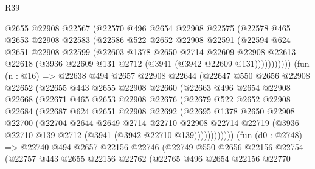 \begin{lexlean}{R39}
\begin{coremodule}
              @2655
              @22908
              @22567
              (@22570
                @496
                @2654
                @22908
                @22575
                (@22578
                  @465
                  @2653
                  @22908
                  @22583
                  (@22586
                    @522
                    @2652
                    @22908
                    @22591
                    (@22594
                      @624
                      @2651
                      @22908
                      @22599
                      (@22603
                        @1378
                        @2650
                        @2714
                        @22609
                        @22908
                        @22613
                        @22618
                        (@3936 @22609 @131 @2712 (@3941 (@3942 @22609 @131)))))))))))
        (fun (n : @16) =>
        @22638
          @494
          @2657
          @22908
          @22644
          (@22647
            @550
            @2656
            @22908
            @22652
            (@22655
              @443
              @2655
              @22908
              @22660
              (@22663
                @496
                @2654
                @22908
                @22668
                (@22671
                  @465
                  @2653
                  @22908
                  @22676
                  (@22679
                    @522
                    @2652
                    @22908
                    @22684
                    (@22687
                      @624
                      @2651
                      @22908
                      @22692
                      (@22695
                        @1378
                        @2650
                        @22908
                        @22700
                        (@22704
                          @2644
                          @2649
                          @2714
                          @22710
                          @22908
                          @22714
                          @22719
                          (@3936 @22710 @139 @2712 (@3941 (@3942 @22710 @139))))))))))))
        (fun (d0 : @2748) =>
        @22740
          @494
          @2657
          @22156
          @22746
          (@22749
            @550
            @2656
            @22156
            @22754
            (@22757
              @443
              @2655
              @22156
              @22762
              (@22765
                @496
                @2654
                @22156
                @22770

\end{coremodule}
\end{lexlean}
